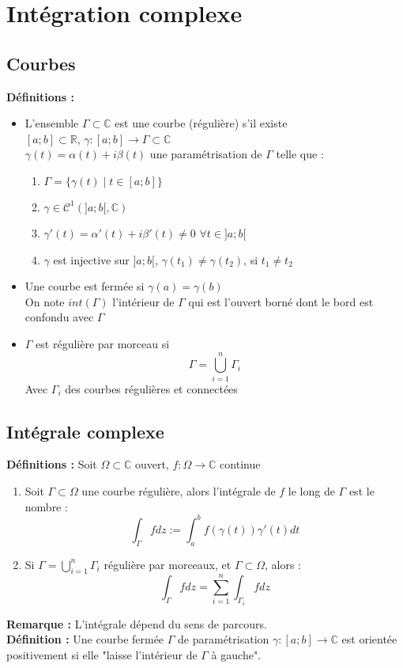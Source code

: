 \section{Intégration complexe}
\subsection{Courbes}
\textbf{Définitions :}
\begin{itemize}
    \item L'ensemble $\Gamma\subset\mathbb{C}$ est une courbe (régulière) s'il existe\\
    $[a;b]\subset\mathbb{R}$, $\gamma : [a;b]\to\Gamma\subset\mathbb{C}$\\
    $\gamma(t) = \alpha(t) + i\beta(t)$ une paramétrisation de $\Gamma$ telle que :
    \begin{enumerate}
        \item $\Gamma = \{\gamma(t)\mid t\in[a;b]\}$
        \item $\gamma \in \mathcal{C}^1(]a;b[, \mathbb{C})$
        \item $\gamma'(t) = \alpha'(t) + i\beta'(t) \neq 0$  $\forall t \in ]a;b[$
        \item $\gamma$ est injective sur $]a;b[$, $\gamma(t_1)\neq\gamma(t_2)$, si $t_1\neq t_2$
    \end{enumerate}
    \item Une courbe est fermée si $\gamma(a)=\gamma(b)$\\
    On note $int(\Gamma)$ l'intérieur de $\Gamma$ qui est l'ouvert borné dont le bord est confondu avec $\Gamma$
    \item $\Gamma$ est régulière par morceau si
    $$\Gamma = \bigcup_{i=1}^n\Gamma_i$$
    Avec $\Gamma_i$ des courbes régulières et connectées
\end{itemize}

\subsection{Intégrale complexe}
\textbf{Définitions :} Soit $\Omega\subset\mathbb{C}$ ouvert, $f : \Omega\to\mathbb{C}$ continue
\begin{enumerate}
    \item Soit $\Gamma\subset\Omega$ une courbe régulière, alors l'intégrale de $f$ le long de $\Gamma$ est le nombre :
    $$\int_{\Gamma}fdz := \int_a^bf(\gamma(t))\gamma'(t)dt$$
    \item Si $\Gamma = \bigcup_{i=1}^n\Gamma_i$ régulière par morceaux, et $\Gamma\subset\Omega$, alors :
    $$\int_{\Gamma}fdz = \sum_{i=1}^n\int_{\Gamma_i}fdz$$
\end{enumerate}
\textbf{Remarque :} L'intégrale dépend du sens de parcours.\\
\textbf{Définition :} Une courbe fermée $\Gamma$ de paramétrisation $\gamma : [a;b]\to\mathbb{C}$ est orientée positivement si elle "laisse l'intérieur de $\Gamma$ à gauche".

